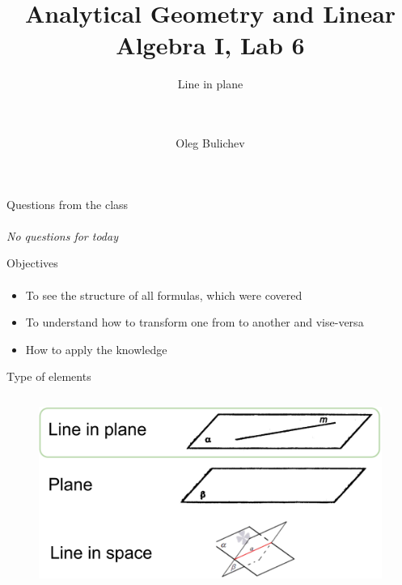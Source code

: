\documentclass[aspectratio=169]{beamer}
\title[AGLA1]{Analytical Geometry and Linear Algebra I, Lab 6} %
\subtitle{Line in plane \\ \  \\ \    
         } %
\author{Oleg Bulichev}
\newcommand{\fbckg}[1]{\usebackgroundtemplate{\texttt{[image: \#1]}}}%
\begin{document}
\setlength{\abovedisplayskip}{0pt}
\setlength{\belowdisplayskip}{0pt}
\setlength{\abovedisplayshortskip}{0pt}
\setlength{\belowdisplayshortskip}{0pt}

\fbckg{fibeamer/figs/title_page.png}

\fbckg{fibeamer/figs/common.png}


\begin{frame}[c]{Questions from the class}
\framesubtitle{}
\centering
    \textit{ \Large No questions for today}
\end{frame}

\begin{frame}[t]{Objectives}
\framesubtitle{}
    \begin{itemize}
        \item To see the structure of all formulas, which were covered
        \item To understand how to transform one from to another and vise-versa 
        \item How to apply the knowledge
    \end{itemize}
\end{frame}

\begin{frame}[t]{Type of elements}
\framesubtitle{}
    \vspace{-0.6cm}
    \begin{figure}[H]
        \centering\includegraphics[height=6cm,width=1\textwidth,keepaspectratio]{line_in_plane.png}
        \label{fig:line_in_plane.png}
    \end{figure}
\end{frame}
\end{document}
